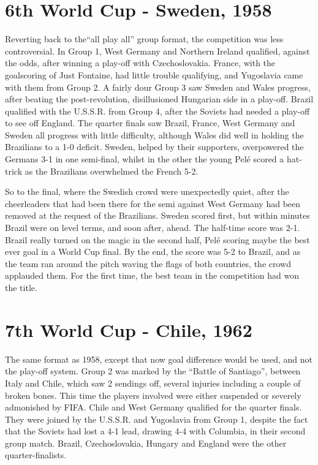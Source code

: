 \section{6th World Cup - Sweden, 1958}
Reverting back to the``all play all'' group format, the competition was less 
controversial. In Group 1, West Germany and Northern Ireland qualified, against
the odds, after winning a play-off with Czechoslovakia. France, with the 
goalscoring of Just Fontaine, had little trouble qualifying, and Yugoslavia 
came with them from Group 2. A fairly dour Group 3 saw Sweden and Wales 
progress, after beating the post-revolution, disillusioned Hungarian side in a
play-off. Brazil qualified with the U.S.S.R. from Group 4, after the Soviets 
had needed a play-off to see off England. The quarter finals saw Brazil, 
France, West Germany and Sweden all progress with little difficulty, although 
Wales did well in holding the Brazilians to a 1-0 deficit. Sweden, helped by 
their supporters, overpowered the Germans 3-1 in one semi-final, whilst in the 
other the young Pel{\'e} scored a hat-trick as the Brazilians overwhelmed the 
French 5-2.

So to the final, where the Swedish crowd were unexpectedly quiet, after the 
cheerleaders that had been there for the semi against West Germany had been 
removed at the request of the Brazilians. Sweden scored first, but within 
minutes Brazil were on level terms, and soon after, ahead. The half-time score
was 2-1. Brazil really turned on the magic in the second half, Pel{\'e} scoring 
maybe the best ever goal in a World Cup final. By the end, the score was 5-2 to
Brazil, and as the team ran around the pitch waving the flags of both 
countries, the crowd applauded them. For the first time, the best team in the 
competition had won the title.
\section{7th World Cup - Chile, 1962}
The same format as 1958, except that now goal difference would be used, and not
the play-off system. Group 2 was marked by the ``Battle of Santiago'', between 
Italy and Chile, which saw 2 sendings off, several injuries including a couple
of broken bones. This time the players involved were either suspended or 
severely admonished by FIFA. Chile and West Germany qualified for the quarter 
finals. They were joined by the U.S.S.R. and Yugoslavia from Group 1, despite 
the fact that the Soviets had lost a 4-1 lead, drawing 4-4 with Columbia, in 
their second group match. Brazil, Czechoslovakia, Hungary and England were the 
other quarter-finalists.

